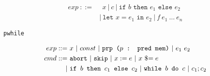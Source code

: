 \documentclass{beamer}
\begin{document}

\begin{frame}{\rml}
  
\begin{align*}
  exp~::=&~ ~ x~\vert ~ c~\vert ~ \texttt{if }b\texttt{ then }e_1\texttt{ else } e_2~\\
  &\vert ~ \texttt{let }x = e_1 \texttt{ in }e_2~\vert ~ f~e_1~\dots~e_n
\end{align*}
\end{frame}


\begin{frame}{\texttt{pwhile}}
  
\begin{align*}
  exp ::=~& x ~\vert ~ const ~\vert ~ \texttt{prp ($p$ : pred mem)}~\vert ~ e_1\ e_2\\
  cmd ::=~& \texttt{abort} ~\vert ~ \texttt{skip} ~\vert ~ x := e ~\vert ~ x\ \$\hspace{-0.25em}= e\\
  \vert ~ & \texttt{if } b \texttt{ then } c_1 \texttt{ else } c_2 ~\vert ~
            \texttt{while } b \texttt{ do } c ~\vert ~ c_1 ; c_2
\end{align*}
\end{frame}




\end{document}
